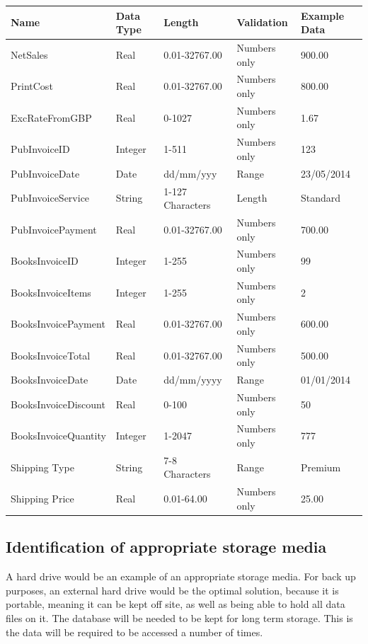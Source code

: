 \begin{center}
\begin{tabular}{|p{3cm}|p{1cm}|p{2.5cm}|p{1.5cm}|p{2cm}|}
    \hline
    \textbf{Name} & \textbf{Data Type} & \textbf{Length} & \textbf{Validation} & \textbf{Example Data} \\ \hline
    NetSales & Real & 0.01-32767.00 & Numbers only & 900.00 \\ \hline
    PrintCost & Real & 0.01-32767.00 & Numbers only & 800.00 \\ \hline
    ExcRateFromGBP & Real & 0-1027 & Numbers only & 1.67 \\ \hline
    PubInvoiceID & Integer & 1-511 & Numbers only & 123 \\ \hline
    PubInvoiceDate & Date & dd/mm/yyy & Range & 23/05/2014 \\ \hline
    PubInvoiceService & String & 1-127 Characters & Length & Standard \\ \hline
    PubInvoicePayment & Real & 0.01-32767.00 & Numbers only & 700.00 \\ \hline
    BooksInvoiceID & Integer & 1-255 & Numbers only & 99 \\ \hline
    BooksInvoiceItems & Integer & 1-255 & Numbers only & 2 \\ \hline
    BooksInvoicePayment & Real & 0.01-32767.00 & Numbers only & 600.00 \\ \hline
    BooksInvoiceTotal & Real & 0.01-32767.00 & Numbers only & 500.00 \\ \hline
    BooksInvoiceDate & Date & dd/mm/yyyy & Range & 01/01/2014 \\ \hline
    BooksInvoiceDiscount & Real & 0-100 & Numbers only & 50 \\ \hline
    BooksInvoiceQuantity & Integer & 1-2047 & Numbers only & 777 \\ \hline
    Shipping Type & String & 7-8 Characters & Range & Premium \\ \hline
    Shipping Price & Real & 0.01-64.00 & Numbers only & 25.00 \\ \hline
    \hline
\end{tabular}
\end{center}

\subsection{Identification of appropriate storage media}

A hard drive would be an example of an appropriate storage media. For back up purposes, an external hard drive would be the optimal solution, because it is portable, meaning it can be kept off site, as well as being able to hold all data files on it. The database will be needed to be kept for long term storage. This is the data will be required to be accessed a number of times.

